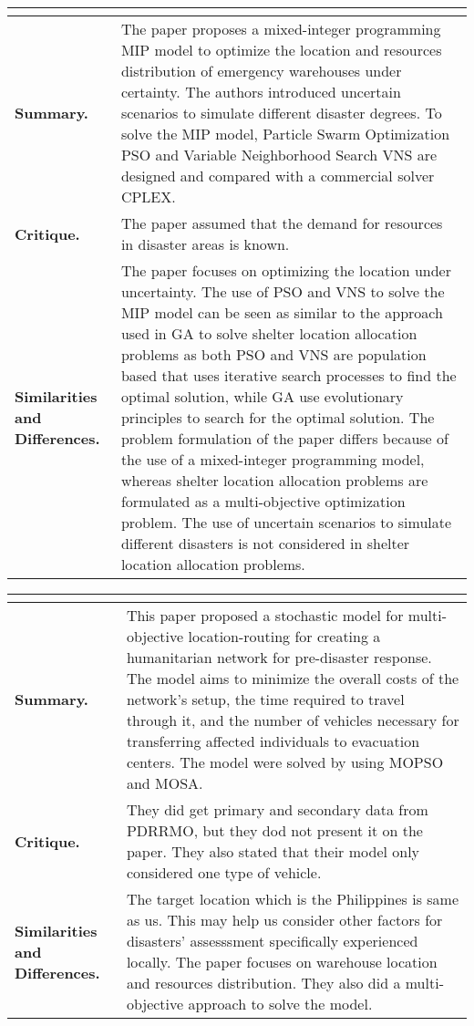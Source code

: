 \begin{longtable}{|L{.2\linewidth}|L{.74\linewidth}|}
	\hline
	\\ \hline
	\textbf{Summary.} & The paper proposes a mixed-integer programming MIP model to optimize the location and resources distribution of emergency warehouses under certainty. The authors introduced uncertain scenarios to simulate different disaster degrees. To solve the MIP model, Particle Swarm Optimization PSO and Variable Neighborhood Search VNS are designed and compared with a commercial solver CPLEX.\\ \hline
	\textbf{Critique.} & The paper assumed that the demand for resources in disaster areas is known.\\ \hline
	\textbf{Similarities and Differences.} & The paper focuses on optimizing the location under uncertainty. The use of PSO and VNS to solve the MIP model can be seen as similar to the approach used in GA to solve shelter location allocation problems as both PSO and VNS are population based that uses iterative search processes to find the optimal solution, while GA use evolutionary principles to search for the optimal solution.	The problem formulation of the paper differs because of the use of a mixed-integer programming model, whereas shelter location allocation problems are formulated as a multi-objective optimization problem. The use of uncertain scenarios to simulate different disasters is not considered in shelter location allocation problems.\\ \hline
\end{longtable}

\begin{longtable}{|L{.2\linewidth}|L{.74\linewidth}|}
	\hline
	\\ \hline
	\textbf{Summary.} & This paper proposed a stochastic model for multi-objective location-routing for creating a humanitarian network for pre-disaster response. The model aims to minimize the overall costs of the network’s setup, the time required to travel through it, and the number of vehicles necessary for transferring affected individuals to evacuation centers. The model were solved by using MOPSO and MOSA. \\ \hline
	\textbf{Critique.} & They did get primary and secondary data from PDRRMO, but they dod not present it on the paper. They also stated that their model only considered one type of vehicle. \\ \hline
	\textbf{Similarities and Differences.} & The target location which is the Philippines is same as us. This may help us consider other factors for disasters' assesssment specifically experienced locally.	The paper focuses on warehouse location and resources distribution. They also did a multi-objective approach to solve the model. \\ \hline
\end{longtable}


